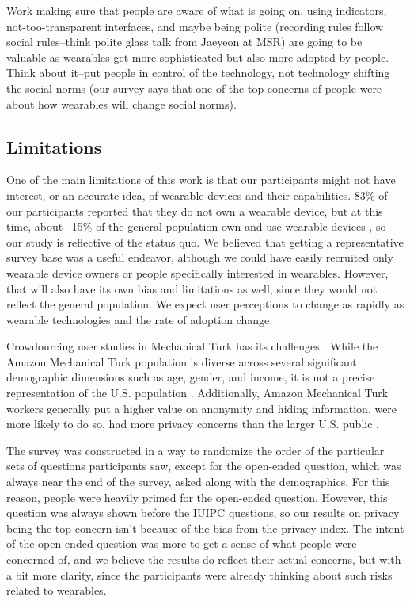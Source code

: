 \documentclass{acm_proc_article-sp}
\begin{document}
 Work making sure that people are aware of what is going on, using indicators, not-too-transparent interfaces, and maybe being polite (recording rules follow social rules--think polite glass talk from Jaeyeon at MSR) are going to be valuable as wearables get more sophisticated but also more adopted by people. Think about it--put people in control of the technology, not technology shifting the social norms (our survey says that one of the top concerns of people were about how wearables will change social norms). 

\subsection{Limitations}
One of the main limitations of this work is that our participants might not have interest, or an accurate idea, of wearable devices and their capabilities. 83\% of our participants reported that they do not own a wearable device, but at this time, about ~15\% of the general population own and use wearable devices \cite{Nilsen}\cite{WearableStatNews}, so our study is reflective of the status quo. We believed that getting a representative survey base was a useful endeavor, although we could have easily recruited only wearable device owners or people specifically interested in wearables. However, that will also have its own bias and limitations as well, since they would not reflect the general population. We expect user perceptions to change as rapidly as wearable technologies and the rate of adoption change. 

Crowdourcing user studies in Mechanical Turk has its challenges \cite{kittur2008crowdsourcing}. While the Amazon Mechanical Turk population is diverse across several significant demographic dimensions such as age, gender, and income, it is not a precise representation of the U.S. population \cite{ross2010crowdworkers}\cite{kelley2010conducting}. Additionally, Amazon Mechanical Turk workers generally put a higher value on anonymity and hiding information, were more likely to do so, had more privacy concerns than the larger U.S. public \cite{kang2014privacy}. 

The survey was constructed in a way to randomize the order of the particular sets of questions participants saw, except for the open-ended question, which was always near the end of the survey, asked along with the demographics. For this reason, people were heavily primed for the open-ended question. However, this question was always shown before the IUIPC questions, so our results on privacy being the top concern isn't because of the bias from the privacy index. The intent of the open-ended question  was more to get a sense of what people were concerned of, and we believe the results do reflect their actual concerns, but with a bit more clarity, since the participants were already thinking about such risks related to wearables. 
\end{document}
